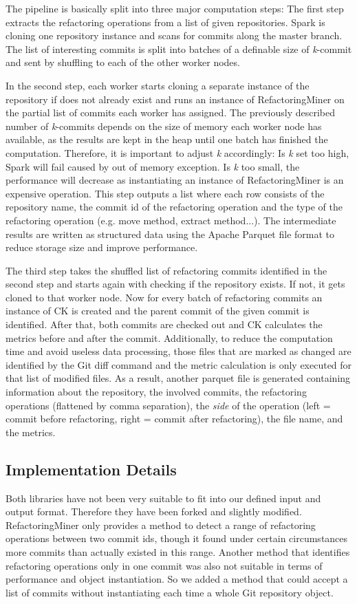 The pipeline is basically split into three major computation steps: The first step extracts the refactoring operations from a list of given repositories. Spark is cloning one repository instance and scans for commits along the master branch. The list of interesting commits is split into batches of a definable size of \emph{k}-commit and sent by shuffling to each of the other worker nodes.

In the second step, each worker starts cloning a separate instance of the repository if does not already exist and runs an instance of RefactoringMiner on the partial list of commits each worker has assigned. The previously described number of \emph{k}-commits depends on the size of memory each worker node has available, as the results are kept in the heap until one batch has finished the computation. Therefore, it is important to adjust \emph{k} accordingly: Is \emph{k} set too high, Spark will fail caused by out of memory exception. Is \emph{k} too small, the performance will decrease as instantiating an instance of RefactoringMiner is an expensive operation. This step outputs a list where each row consists of the repository name, the commit id of the refactoring operation and the type of the refactoring operation (e.g. move method, extract method...). The intermediate results are written as structured data using the Apache Parquet file format \cite{parquet} to reduce storage size and improve performance.

The third step takes the shuffled list of refactoring commits identified in the second step and starts again with checking if the repository exists. If not, it gets cloned to that worker node. Now for every batch of refactoring commits an instance of CK is created and the parent commit of the given commit is identified. After that, both commits are checked out and CK calculates the metrics before and after the commit. Additionally, to reduce the computation time and avoid useless data processing, those files that are marked as changed are identified by the Git diff command and the metric calculation is only executed for that list of modified files. As a result, another parquet file is generated containing information about the repository, the involved commits, the refactoring operations (flattened by comma separation), the \emph{side} of the operation (left = commit before refactoring, right = commit after refactoring), the file name, and the metrics.

\subsection{Implementation Details}
Both libraries have not been very suitable to fit into our defined input and output format. Therefore they have been forked and slightly modified. RefactoringMiner only provides a method to detect a range of refactoring operations between two commit ids, though it found under certain circumstances more commits than actually existed in this range. Another method that identifies refactoring operations only in one commit was also not suitable in terms of performance and object instantiation. So we added a method that could accept a list of commits without instantiating each time a whole Git repository object. 

